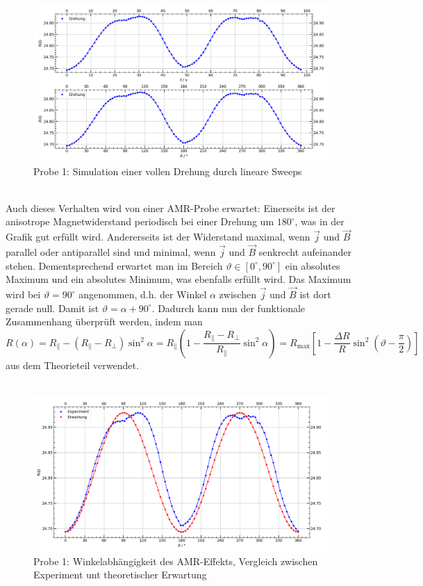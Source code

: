 \documentclass[german,  %
parskip=full,  %
]{scrartcl}
\begin{document}
\begin{figure}[h!]\centering
\includegraphics[width=\textwidth]{Probe1_Drehung.png}
\caption{Probe 1: Simulation einer vollen Drehung durch lineare Sweeps}
\end{figure}\\
Auch dieses Verhalten wird von einer AMR-Probe erwartet: Einerseits ist der anisotrope Magnetwiderstand periodisch bei einer Drehung um \(180^{\circ}\), was in der Grafik gut erfüllt wird. Andererseits ist der Widerstand maximal, wenn \(\vec{j}\) und \(\vec{B}\) parallel oder antiparallel sind und minimal, wenn \(\vec{j}\) und \(\vec{B}\) senkrecht aufeinander stehen. Dementsprechend erwartet man im Bereich \(\vartheta\in\left[0^{\circ},90^{\circ}\right]\) ein absolutes Maximum und ein absolutes Minimum, was ebenfalls erfüllt wird. Das Maximum wird bei \(\vartheta = 90^{\circ}\)  angenommen, d.h. der Winkel \(\alpha\) zwischen \(\vec{j}\) und \(\vec{B}\) ist dort gerade null. Damit ist \(\vartheta = \alpha + 90^{\circ}\). Dadurch kann nun der funktionale Zusammenhang überprüft werden, indem man
\[R(\alpha) = R_{\parallel} - (R_{\parallel} - R_{\perp})\sin^2\alpha = R_{\parallel} \left(1 - \frac{R_{\parallel} - R_{\perp}}{R_{\parallel}}\sin^2\alpha\right) = R_{\mathrm{max}}\left[1 - \frac{\Delta R}{R}\sin^2\left(\vartheta - \frac{\pi}{2}\right)\right] \]
aus dem Theorieteil verwendet. \\\\
\begin{figure}[h!]\centering
\includegraphics[width=\textwidth]{Probe1_Drehung_vs_Erwartung.png}
\caption{Probe 1: Winkelabhängigkeit des AMR-Effekts, Vergleich zwischen Experiment unt theoretischer Erwartung}
\end{figure} \\
\end{document}
